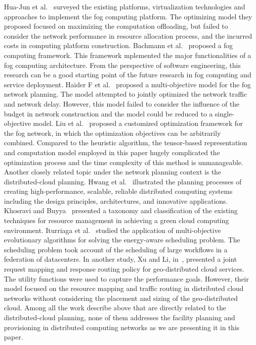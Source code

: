 \documentclass[10pt,journal,compsoc]{IEEEtran}
\begin{document}
Hua-Jun et al.~\cite{hong2016dynamic} surveyed the existing platforms, virtualization technologies and approaches to implement the fog computing platform. The optimizing model they proposed focused on maximizing the computation offloading, but failed to consider the network performance in resource allocation process, and the incurred costs in computing platform construction.
Bachmann et al.~\cite{bachmann2017design} proposed a fog computing framework. This framework mplemented the major functionalities of a fog computing architecture. From the perspective of software engineering, this research can be a good starting point of the future research in fog computing and service deployment.
Haider F et al.~\cite{haider2017planning} proposed a multi-objective model for the fog network planning. The model attempted to jointly optimized the network traffic and network delay. However, this model failed to consider the influence of the budget in network construction and the model could be reduced to a single-objective model.
Liu et al.~\cite{liu2018tensor} proposed a customized optimization framework for the fog network, in which the optimization objectives can be arbitrarily combined. Compared to the heuristic algorithm, the tensor-based representation and computation model employed in this paper hugely complicated the optimization process and the time complexity of this method is unmanageable.
Another closely related topic under the network planning context is the distributed-cloud planning. 
Hwang et al.~\cite{hwang2013distributed} illustrated the planning processes of creating high-performance, scalable, reliable distributed computing systems including the design principles, architectures, and innovative applications. 
Khosravi and Buyya~\cite{enerfoot} presented a taxonomy and classification of the existing techniques for resource management in achieving a green cloud computing environment. 
Iturriaga et al.~\cite{ITOR:ITOR12294} studied the application of multi-objective evolutionary algorithms for solving the energy-aware scheduling problem. The scheduling problem took account of the scheduling of large workflows in a federation of datacenters. In another study, Xu and Li, in~\cite{6566873}, presented a joint request mapping and response routing policy for geo-distributed cloud services. The utility functions were used to capture the performance goals. However, their model focused on the resource mapping and traffic routing in distributed cloud networks without considering the placement and sizing of the geo-distributed cloud. 
Among all the work describe above that are directly related to the distributed-cloud planning, none of them addresses the facility planning and provisioning in distributed computing networks as we are presenting it in this paper.
\end{document}
